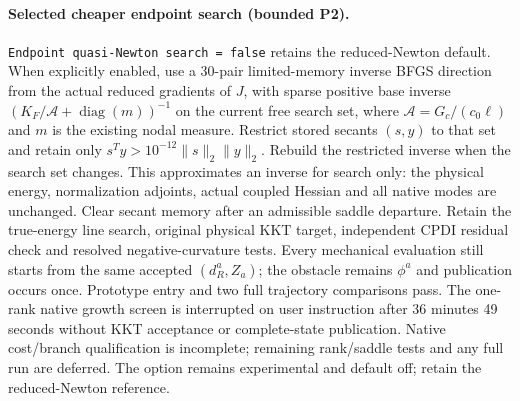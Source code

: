\documentclass[11pt]{article}
\begin{document}
\paragraph{Selected cheaper endpoint search (bounded P2).}
\texttt{Endpoint quasi-Newton search = false} retains the reduced-Newton default.
When explicitly enabled, use a 30-pair limited-memory inverse BFGS direction
from the actual reduced gradients of $J$, with sparse positive base inverse
$(K_F/\mathcal A+\operatorname{diag}(m))^{-1}$ on the current free search set,
where $\mathcal A=G_c/(c_0\ell)$ and $m$ is the existing nodal measure.
Restrict stored secants $(s,y)$ to that set and retain only
$s^Ty>10^{-12}\|s\|_2\|y\|_2$. Rebuild the restricted inverse when the
search set changes. This approximates an inverse for search only: the physical
energy, normalization adjoints, actual coupled Hessian and all native modes
are unchanged. Clear secant memory after an admissible saddle departure.
Retain the true-energy line search, original physical KKT target, independent
CPDI residual check and resolved negative-curvature tests. Every mechanical
evaluation still starts from the same accepted $(d_R^a,Z_a)$; the obstacle
remains $\phi^a$ and publication occurs once. Prototype entry and two full
trajectory comparisons pass. The one-rank native growth screen is interrupted
on user instruction after 36 minutes 49 seconds without KKT acceptance or
complete-state publication. Native cost/branch qualification is incomplete;
remaining rank/saddle tests and any full run are deferred. The option remains
experimental and default off; retain the reduced-Newton reference.
\end{document}
